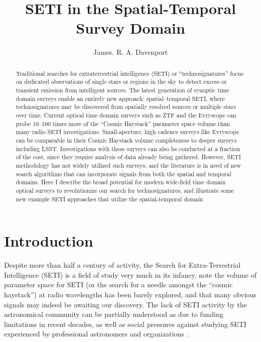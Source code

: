 \documentclass[twocolumn]{aastex62}
\begin{document}
\title{SETI in the Spatial-Temporal Survey Domain}



\author{James. R. A. Davenport}


\begin{abstract}
Traditional searches for extraterrestrial intelligence (SETI) or ``technosignatures'' focus on dedicated observations of single stars or regions in the sky to detect excess or transient emission from intelligent sources. The latest generation of synoptic time domain surveys  enable an entirely new approach: spatial--temporal SETI, where technosignatures may be discovered from spatially resolved sources or multiple stars over time. 
Current optical time domain surveys such as ZTF and the Evryscope can probe 10--100 times more of the ``Cosmic Haystack'' parameter space volume than many radio SETI investigations. Small-aperture, high cadence surveys like Evryscope can be comparable in their Cosmic Haystack volume completeness to deeper surveys including LSST. Investigations with these surveys can also be conducted at a fraction of the cost, since they require analysis of data already being gathered. 
However, SETI methodology has not widely utilized such surveys, and the literature is in need of new search algorithms that can incorporate signals from both the spatial and temporal domains.
Here I describe the broad potential for modern wide-field time domain optical surveys to revolutionize our search for technosignatures, and illustrate some new example SETI approaches that utilize the spatial-temporal domain
\end{abstract}





\section{Introduction}

Despite more than half a century of activity, the Search for Extra-Terrestrial Intelligence (SETI) is a field of study very much in its infancy. 
\citet{wright2018c} note the volume of parameter space for SETI (or the search for a needle amongst the ``cosmic haystack'') at radio wavelengths has been barely explored, and that many obvious signals may indeed be awaiting our discovery. 
The lack of SETI activity by the astronomical community can be partially understood as due to funding limitations in recent decades, as well as social pressures against studying SETI experienced by professional astronomers and organizations \citep{wright2018b}. 
\end{document}
